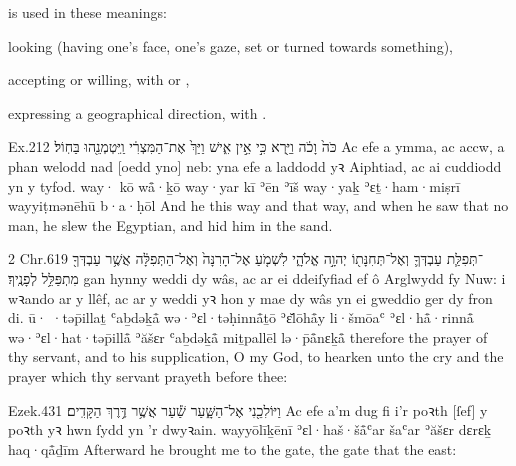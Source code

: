 \begin{paper}
	 is used in these meanings:
	\begin{compactitem}
		\item looking (having one’s face, one’s gaze, set or turned towards something),
		\item accepting or willing, with  or ,
		\item expressing a geographical direction, with .
	\end{compactitem}
\end{paper}

\begin{example}{Ex.}{2}{12}{}{}
	\quoling
	{ כֹּה֙ וָכֹ֔ה וַיַּ֖רְא כִּ֣י אֵ֣ין אִ֑ישׁ וַיַּךְ֙ אֶת־הַמִּצְרִ֔י וַֽיִּטְמְנֵ֖הוּ בַּחֽוֹל׃}
	{Ac efe a  ymma, ac accw, a phan welodd nad [oedd yno] neb: yna efe a laddodd yꝛ Aiphtiad, ac ai cuddiodd yn y tyfod.}
	{way· kō wå̄·ḵō way·yar kī ʾēn ʾīš way·yaḵ ʾɛṯ·ham·miṣrī wayyiṭmənēhū b·a·ḥōl}
	{And he  this way and that way, and when he saw that  no man, he slew the Egyptian, and hid him in the sand.}
\end{example}

\begin{example}{2 Chr.}{6}{19}{}{}
	\quoling
	{ ־תְּפִלַּ֧ת עַבְדְּךָ֛ וְאֶל־תְּחִנָּת֖וֹ יְהוָ֣ה אֱלֹהָ֑י לִשְׁמֹ֤עַ אֶל־הָרִנָּה֙ וְאֶל־הַתְּפִלָּ֔ה אֲשֶׁ֥ר עַבְדְּךָ֖ מִתְפַּלֵּ֥ל לְפָנֶֽיךָ׃}
	{ gan hynny  weddi dy wâs, ac ar ei ddeiſyfiad ef ô Arglwydd fy Nuw: i wꝛando ar y llêf, ac ar y weddi yꝛ hon y mae dy wâs yn ei gweddio ger dy fron di.}
	{ū· ·təp̄illaṯ ʿaḇdəḵå̄ wə·ʾɛl·təḥinnå̄ṯō {\YHWH} ʾɛ̆lōhå̄y li·šmōaʿ ʾɛl·hå̄·rinnå̄ wə·ʾɛl·hat·təp̄illå̄ ʾăšɛr ʿaḇdəḵå̄ miṯpallēl lə·p̄å̄nɛḵå̄}
	{ therefore  the prayer of thy servant, and to his supplication, O {\LORD} my God, to hearken unto the cry and the prayer which thy servant prayeth before thee:}
\end{example}

\begin{example}{Ezek.}{43}{1}{}{}
	\quoling
	{וַיּוֹלִכֵ֖נִי אֶל־הַשָּׁ֑עַר שַׁ֕עַר אֲשֶׁ֥ר  דֶּ֥רֶךְ הַקָּדִֽים׃}
	{Ac efe a’m dug fi i’r poꝛth [ſef] y poꝛth yꝛ hwn ſydd yn   ’r dwyꝛain.}
	{wayyōlīḵēnī ʾɛl·haš·šå̄ʿar šaʿar ʾăšɛr  dɛrɛḵ haq·qå̄ḏīm}
	{Afterward he brought me to the gate,  the gate that   the east:}
\end{example}

